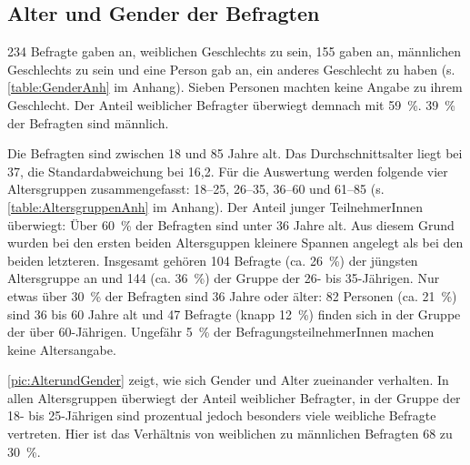 \subsection{Alter und Gender der Befragten}
\label{sec:AlterundGender}
234 Befragte gaben an, weiblichen Geschlechts zu sein, 155 gaben an, männlichen Geschlechts zu sein und eine Person gab an, ein anderes Geschlecht zu haben (s. \autoref{table:GenderAnh} im Anhang). 
Sieben Personen machten keine Angabe zu ihrem Geschlecht. 
Der Anteil weiblicher Befragter überwiegt demnach mit 59~\%. 39~\% der Befragten sind männlich. 

Die Befragten sind zwischen 18 und 85 Jahre alt. 
Das Durchschnittsalter liegt bei 37, die Standardabweichung bei 16,2. 
Für die Auswertung werden folgende vier Altersgruppen zusammengefasst: 18--25, 26--35, 36--60 und 61--85 (s. \autoref{table:AltersgruppenAnh} im Anhang).
Der Anteil junger TeilnehmerInnen überwiegt: Über 60~\% der Befragten sind unter 36 Jahre alt.
Aus diesem Grund wurden bei den ersten beiden Altersguppen kleinere Spannen angelegt als bei den beiden letzteren. 
Insgesamt gehören 104 Befragte (ca. 26~\%) der jüngsten Altersgruppe an und 144 (ca. 36~\%) der Gruppe der 26- bis 35-Jährigen.
Nur etwas über 30~\% der Befragten sind 36 Jahre oder älter:
82 Personen (ca. 21~\%) sind 36 bis 60 Jahre alt und 47 Befragte (knapp 12~\%) finden sich in der Gruppe der über 60-Jährigen. 
Ungefähr 5~\% der BefragungsteilnehmerInnen machen keine Altersangabe.

\autoref{pic:AlterundGender} zeigt, wie sich Gender und Alter zueinander verhalten. 
In allen Altersgruppen überwiegt der Anteil weiblicher Befragter, in der Gruppe der 18- bis 25-Jährigen sind prozentual jedoch besonders viele weibliche Befragte vertreten. 
Hier ist das Verhältnis von weiblichen zu männlichen Befragten 68 zu 30~\%. 

